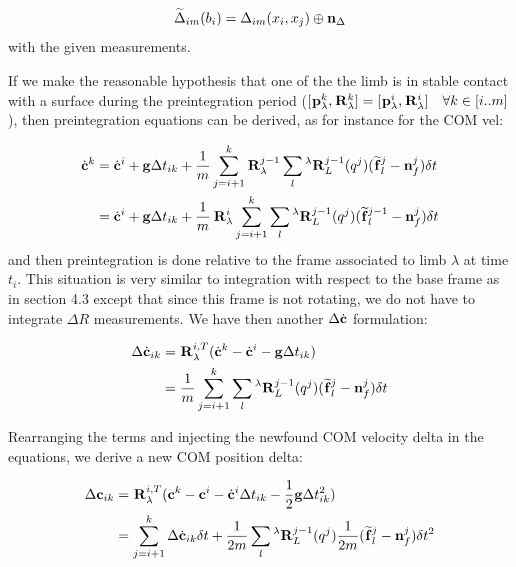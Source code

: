 \documentclass[11pt]{article}
\newcommand{\Rot}[2]{\prescript{#1}{}{\bfR}_{#2}}
\newcommand{\noise}{\bfn}
\newcommand{\posi}[2]{\prescript{#1}{}{\bfp}_{#2}}
\newcommand{\forcem}[2]{\prescript{#1}{}{\widetilde{\bff}}_{#2}}
\newcommand{\COM}{\bfc}
\newcommand{\COMd}{\dot{\bfc}}
\begin{document}
\begin{equation}
\widetilde{\Delta}_{im}(b_i) = \Delta_{im}(x_i, x_j) \oplus  \noise_{\Delta} 
\end{equation}
with the given measurements. 

If we make the reasonable hypothesis that one of the the limb is in stable contact with a surface during the preintegration period ($[\posi{}{\lambda}^k, \Rot{}{\lambda}^k ] = [\posi{}{\lambda}^i, \Rot{}{\lambda}^i ] \quad \forall k \in [i..m]$), then preintegration equations can be derived, as for instance for the COM vel:

\begin{equation}
	\begin{split}
	\COMd^{k} &= \COMd^{i} + \bfg \Delta t_{ik} + \frac{1}{m} \sum_{j=i+1}^{k} \Rot{}{\lambda}^{j-1} \sum_l \Rot{\lambda}{L}^{j-1}(q^j) (\forcem{}{l}^{j} - \noise_f^{j}) \delta t
	\\
	&= \COMd^{i} + \bfg \Delta t_{ik} + \frac{1}{m} \Rot{}{\lambda}^{i} \sum_{j=i+1}^{k} \sum_l \Rot{\lambda}{L}^{j-1}(q^j) (\forcem{}{l}^{j-1} - \noise_f^{j}) \delta t
	\end{split}
\end{equation}
and then preintegration is done relative to the frame associated to limb $\lambda$ at time $t_i$. This situation is very similar to integration with respect to the base frame as in section 4.3 except that since this frame is not rotating, we do not have to integrate $\Delta R$ measurements. We have then another $\Delta \COMd$ formulation:

\begin{equation}
	\begin{split}
	\Delta \COMd_{ik} &= \Rot{}{\lambda}^{i,T}(\COMd^{k} - \COMd^{i} - \bfg \Delta t_{ik})
	\\
	&= \frac{1}{m} \sum_{j=i+1}^{k} \sum_l \Rot{\lambda}{L}^{j-1}(q^j) (\forcem{}{l}^{j} - \noise_f^{j}) \delta t
	\end{split}
\end{equation}

Rearranging the terms and injecting the newfound COM velocity delta in the equations, we derive a new COM position delta:


\begin{equation}
\begin{split}
\Delta \COM_{ik} &= \Rot{}{\lambda}^{i,T}(\COM^{k} - \COM^{i} - \COMd^{i}\Delta t_{ik} - \frac{1}{2} \bfg \Delta t_{ik}^2)
\\
&=  \sum_{j=i+1}^{k} \Delta \COMd_{ik} \delta t + \frac{1}{2m}\sum_l \Rot{\lambda}{L}^{j-1}(q^j) \frac{1}{2m}(\forcem{}{l}^{j} - \noise_f^{j}) \delta t^2
\end{split}
\end{equation}
\end{document}
